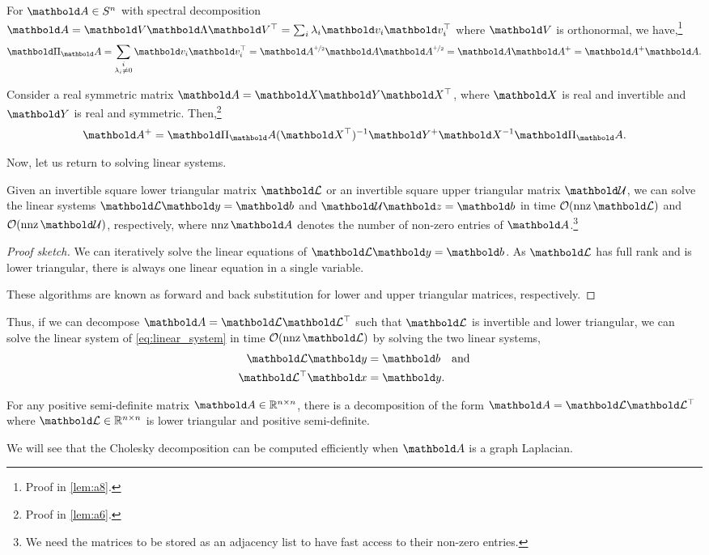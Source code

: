 \begin{lem}
For $\mA \in \sS^n$ with spectral decomposition $\mA = \mV\mLambda\trans{\mV} = \sum_i \lambda_i \vv_i \trans{\vv_i}$ where $\mV$ is orthonormal, we have,\footnote{Proof in \cref{lem:a8}.} \begin{align}
    \mPi_\mA = \sum_{\substack{i \\ \lambda_i \neq 0}} \vv_i \trans{\vv_i} = \mA^{\nicefrac{+}{2}}\mA\mA^{\nicefrac{+}{2}} = \mA\pinv{\mA} = \pinv{\mA}\mA.
\end{align}
\end{lem}

\begin{lem} Consider a real symmetric matrix $\mA = \mX\mY\trans{\mX}$, where $\mX$ is real and invertible and $\mY$ is real and symmetric. Then,\footnote{Proof in \cref{lem:a6}.} \begin{align}
    \pinv{\mA} = \mPi_\mA\inv{(\trans{\mX})}\pinv{\mY}\inv{\mX}\mPi_\mA.
\end{align}
\end{lem}

Now, let us return to solving linear systems.

\begin{lem}
Given an invertible square lower triangular matrix $\mCalL$ or an invertible square upper triangular matrix $\mCalU$, we can solve the linear systems $\mCalL\vy = \vb$ and $\mCalU\vz = \vb$ in time $\LandauO{\nnz{\mCalL}}$ and $\LandauO{\nnz{\mCalU}}$, respectively, where $\nnz{\mA}$ denotes the number of non-zero entries of $\mA$.\footnote{We need the matrices to be stored as an adjacency list to have fast access to their non-zero entries.}
\end{lem}\begin{proof}[Proof sketch] We can iteratively solve the linear equations of $\mCalL\vy = \vb$. As $\mCalL$ has full rank and is lower triangular, there is always one linear equation in a single variable.

These algorithms are known as forward and back substitution for lower and upper triangular matrices, respectively.
\end{proof}

Thus, if we can decompose $\mA = \mCalL\trans{\mCalL}$ such that $\mCalL$ is invertible and lower triangular, we can solve the linear system of \cref{eq:linear_system} in time $\LandauO{\nnz{\mCalL}}$ by solving the two linear systems, \begin{align}
    \mCalL\vy &= \vb \quad\text{and} \\
    \trans{\mCalL}\vx &= \vy.
\end{align}

\begin{lem} For any positive semi-definite matrix $\mA \in \R^{n \times n}$, there is a decomposition of the form $\mA = \mCalL\trans{\mCalL}$ where $\mCalL \in \R^{n \times n}$ is lower triangular and positive semi-definite.
\end{lem}

We will see that the Cholesky decomposition can be computed efficiently when $\mA$ is a graph Laplacian.